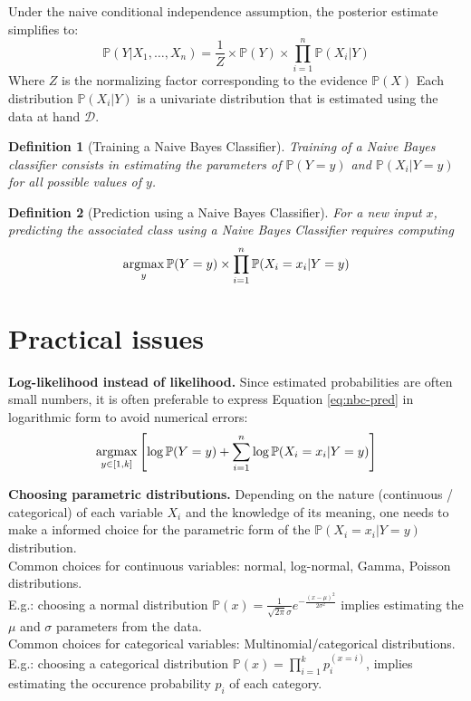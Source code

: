 \documentclass{article}
\newtheorem*{definition}{Definition}
\newcommand{\argmax}{\operatornamewithlimits{argmax}}
\begin{document}
Under the naive conditional independence assumption, the posterior estimate simplifies to:
\begin{equation*}
\mathbb{P}(Y|X_1,\ldots,X_n) = \frac{1}{Z} \times \mathbb{P}(Y) \times \prod_{i=1}^n \mathbb{P}(X_i | Y)
\end{equation*}
Where $Z$ is the normalizing factor corresponding to the evidence $\mathbb{P}(X)$
Each distribution $\mathbb{P}(X_i | Y)$ is a univariate distribution that is estimated using the data at hand $\mathcal{D}$.

\begin{definition}[Training a Naive Bayes Classifier]
Training of a Naive Bayes classifier consists in estimating the parameters of $\mathbb{P}(Y=y)$ and $\mathbb{P}(X_i | Y=y)$ for all possible values of $y$.
\end{definition}

\begin{definition}[Prediction using a Naive Bayes Classifier]
For a new input $x$, predicting the associated class using a Naive Bayes Classifier requires computing 
\begin{equation}
\argmax\limits_{y} \mathbb{P}(Y=y) \times \prod_{i=1}^n \mathbb{P}(X_i=x_i | Y=y)
\label{eq:nbc-pred}
\end{equation}
\end{definition}

\section*{Practical issues}

\textbf{Log-likelihood instead of likelihood.} Since estimated probabilities are often small numbers, it is often preferable to express Equation \ref{eq:nbc-pred} in logarithmic form to avoid numerical errors:
\begin{equation}
\argmax\limits_{y\in[1,k]} \left[ \log\mathbb{P}(Y=y) + \sum_{i=1}^n \log \mathbb{P}(X_i=x_i | Y=y) \right]
\end{equation}

\textbf{Choosing parametric distributions.} Depending on the nature (continuous / categorical) of each variable $X_i$ and the knowledge of its meaning, one needs to make a informed choice for the parametric form of the $\mathbb{P}(X_i=x_i | Y=y)$ distribution.\\
Common choices for continuous variables: normal, log-normal, Gamma, Poisson distributions.\\
E.g.: choosing a normal distribution $\mathbb{P}(x) = \frac{1}{\sqrt{2\pi}\sigma} e^{-\frac{(x-\mu)^2}{2\sigma^2}}$ implies estimating the $\mu$ and $\sigma$ parameters from the data.\\
Common choices for categorical variables: Multinomial/categorical distributions.\\
E.g.: choosing a categorical distribution $\mathbb{P}(x) = \prod_{i=1}^k p_i^{(x=i)}$, implies estimating the occurence probability $p_i$ of each category.
\end{document}
